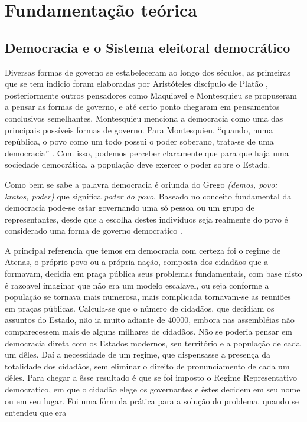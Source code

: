 \section{Fundamentação teórica}
\subsection{Democracia e o Sistema eleitoral democrático}
Diversas formas de governo se estabeleceram ao longo dos séculos, 
as primeiras que se tem indicio foram elaboradas por Aristóteles discípulo
de Platão , posteriormente outros pensadores como Maquiavel e Montesquieu se propuseram
a pensar as formas de governo, e até certo ponto chegaram em pensamentos conclusivos semelhantes.
Montesquieu menciona a democracia como uma das principais possíveis formas de governo. 
Para Montesquieu, “quando, numa república, o povo como um todo possui o poder soberano,
trata-se de uma democracia” \cite{de1857oeuvres}. Com isso, podemos perceber 
claramente que para que haja uma sociedade democrática, a população deve exercer
o poder sobre o Estado. \par
Como bem se sabe a palavra democracia é oriunda do Grego \emph{(demos, povo; kratos, poder)} 
que significa \emph{poder do povo}. Baseado no conceito fundamental da democracia
pode-se estar governando uma só pessoa ou um grupo de representantes, desde que
a escolha destes individuos seja realmente do povo é considerado uma forma de governo
democratico \cite[A democracia]{ribeiro2001democracia}. \par 
A principal referencia que temos em democracia com certeza foi o regime de Atenas, 
o próprio povo ou a própria nação, composta dos cidadãos que a formavam,
decidia em praça pública seus problemas fundamentais, com base nisto é razoavel
imaginar que não era um modelo escalavel, ou seja conforme a população se tornava 
mais numerosa, mais complicada tornavam-se as reuniões em praças públicas. 
Calcula-se que o número de cidadãos, que decidiam os assuntos do Estado,
não ia muito adiante de 40000, embora nas assembléias não comparecessem mais de
alguns milhares de cidadãos. Não se poderia pensar em democracia direta com os
Estados modernos, seu território e a população de cada um dêles. 
Daí a necessidade de um regime, que dispensasse a presença da totalidade dos 
cidadãos, sem eliminar o direito de pronunciamento de cada um dêles. 
Para chegar a êsse resultado é que se foi imposto o Regime Representativo democratico,
em que o cidadão elege os governantes e êstes decidem em seu nome ou em seu lugar.
Foi uma fórmula prática para a solução do problema. quando se entendeu que era
